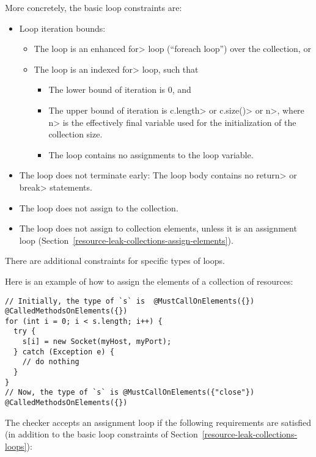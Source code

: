 More concretely, the basic loop constraints are:
\begin{itemize}
\item Loop iteration bounds:
  \begin{itemize}
  \item
    The loop is an enhanced \<for> loop (``foreach loop'') over the collection, or
  \item
    The loop is an indexed \<for> loop, such that
    \begin{itemize}
    \item The lower bound of iteration is 0, and
    \item The upper bound of iteration is \<c.length> or \<c.size()> or \<n>, where \<n> is the effectively final variable used for the initialization of the collection size.
    \item The loop contains no assignments to the loop variable.
    \end{itemize}
  \end{itemize}
\item The loop does not terminate early: The loop body contains no \<return> or \<break> statements.
\item The loop does not assign to the collection.
\item The loop does not assign to collection elements, unless it is an
  assignment loop (Section~\ref{resource-leak-collections-assign-elements}).
\end{itemize}

\noindent There are additional constraints for specific types of loops.




Here is an example of how to assign the elements of a collection of resources:

\begin{Verbatim}
// Initially, the type of `s` is  @MustCallOnElements({}) @CalledMethodsOnElements({})
for (int i = 0; i < s.length; i++) {
  try {
    s[i] = new Socket(myHost, myPort);
  } catch (Exception e) {
    // do nothing
  }
}
// Now, the type of `s` is @MustCallOnElements({"close"}) @CalledMethodsOnElements({})
\end{Verbatim}

The checker accepts an assignment loop if the following requirements are
satisfied (in addition to the basic loop constraints of Section~\ref{resource-leak-collections-loops}):

